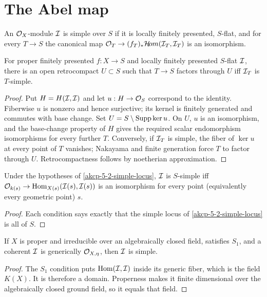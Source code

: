 \section{The Abel map}

\begin{definition}
\label{akcp-5-1-simple}
An $\mathcal O_X$-module $\mathcal I$ is simple over $S$ if it is locally finitely presented,
$S$-flat, and for every $T\to S$ the canonical map
$\mathcal O_T\to(f_T)_*\mathcal H\!om(\mathcal I_T,\mathcal I_T)$ is an isomorphism.
\end{definition}

\begin{proposition}
\label{akcp-5-2-simple-locus}
For proper finitely presented $f:X\to S$ and locally finitely presented
$S$-flat $\mathcal I$, there is an open retrocompact $U\subset S$ such that
$T\to S$ factors through $U$ iff $\mathcal I_T$ is $T$-simple.
\end{proposition}
\begin{proof}
Put $H=H(\mathcal I,\mathcal I)$ and let $u:H\to\mathcal O_S$ correspond to the identity.
Fiberwise $u$ is nonzero and hence surjective; its kernel is finitely generated
and commutes with base change.  Set $U=S\setminus\operatorname{Supp}\ker u$.  On $U$, $u$
is an isomorphism, and the base-change property of $H$ gives the required
scalar endomorphism isomorphisms for every further $T$.  Conversely, if
$\mathcal I_T$ is simple, the fiber of $\ker u$ at every point of $T$ vanishes;
Nakayama and finite generation force $T$ to factor through $U$.  Retrocompactness
follows by noetherian approximation.
\end{proof}

\begin{corollary}
\label{akcp-5-3-simple-fibers}
Under the hypotheses of \cref{akcp-5-2-simple-locus}, $\mathcal I$ is $S$-simple iff
$\mathcal O_{k(s)}\to\operatorname{Hom}_{X(s)}(\mathcal I(s),\mathcal I(s))$ is an isomorphism for every point
(equivalently every geometric point) $s$.
\end{corollary}
\begin{proof}
Each condition says exactly that the simple locus of
\cref{akcp-5-2-simple-locus} is all of $S$.
\end{proof}

\begin{lemma}
\label{akcp-5-4-integral-simple}
If $X$ is proper and irreducible over an algebraically closed field, satisfies
$S_1$, and a coherent $\mathcal I$ is generically $\mathcal O_{X,\eta}$, then $\mathcal I$ is simple.
\end{lemma}
\begin{proof}
The $S_1$ condition puts $\operatorname{Hom}(\mathcal I,\mathcal I)$ inside its generic fiber, which is
the field $K(X)$.  It is therefore a domain.  Properness makes it finite
dimensional over the algebraically closed ground field, so it equals that field.
\end{proof}

